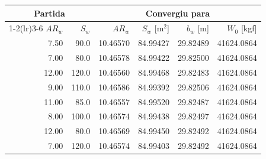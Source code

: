 \begin{tabular}{rrrrrr}
\toprule
\multicolumn{2}{c}{Partida} & \multicolumn{4}{c}{Convergiu para} \\
\cmidrule(lr){1-2}\cmidrule(lr){3-6}
$AR_w$ & $S_w$ & $AR_w$ & $S_w$ [m$^2$] & $b_w$ [m] & $W_0$ [kgf] \\
\midrule
7.50 & 90.0 & 10.46570 & 84.99427 & 29.82489 & 41624.0864 \\
7.00 & 80.0 & 10.46578 & 84.99422 & 29.82500 & 41624.0864 \\
12.00 & 120.0 & 10.46560 & 84.99468 & 29.82483 & 41624.0864 \\
9.00 & 110.0 & 10.46586 & 84.99392 & 29.82506 & 41624.0864 \\
11.00 & 85.0 & 10.46557 & 84.99520 & 29.82487 & 41624.0864 \\
8.00 & 100.0 & 10.46574 & 84.99438 & 29.82497 & 41624.0864 \\
12.00 & 80.0 & 10.46569 & 84.99450 & 29.82492 & 41624.0864 \\
7.00 & 120.0 & 10.46574 & 84.99403 & 29.82492 & 41624.0864 \\
\bottomrule
\end{tabular}